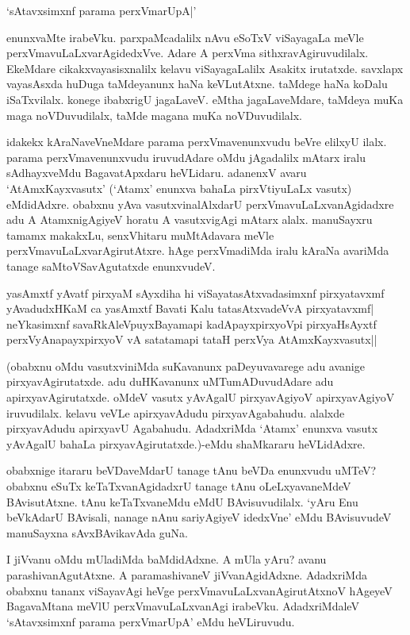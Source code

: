 \begin{shloka}
`sAtavxsimxnf parama perxVmarUpA|'
\end{shloka}

\noindent enunxvaMte irabeVku. parxpaMcadalilx nAvu eSoTxV viSayagaLa meVle perxVmavuLaLxvarAgidedxVve. Adare A perxVma sithxravAgiruvudilalx. EkeMdare cikakxvayasisxnalilx kelavu viSayagaLalilx Asakitx irutatxde. savxlapx vayasAsxda huDuga taMdeyanunx haNa keVLutAtxne. taMdege haNa koDalu iSaTxvilalx. konege ibabxrigU jagaLaveV. eMtha jagaLaveMdare, taMdeya muKa maga noVDuvudilalx, taMde magana muKa noVDuvudilalx.

idakekx kAraNaveVneMdare parama perxVmavenunxvudu beVre elilxyU ilalx. parama perxVmavenunxvudu iruvudAdare oMdu jAgadalilx mAtarx iralu sAdhayxveMdu BagavatApxdaru heVLidaru. adanenxV avaru `AtAmxKayxvasutx' (`Atamx' enunxva bahaLa pirxVtiyuLaLx vasutx) eMdidAdxre. obabxnu yAva vasutxvinalAlxdarU perxVmavuLaLxvanAgidadxre adu A AtamxnigAgiyeV horatu A vasutxvigAgi mAtarx alalx. manuSayxru tamamx makakxLu, senxVhitaru muMtAdavara meVle perxVmavuLaLxvarAgirutAtxre. hAge perxVmadiMda iralu kAraNa avariMda tanage saMtoVSavAgutatxde enunxvudeV.

\begin{shloka}
yasAmxtf yAvatf pirxyaM sAyxdiha hi viSayatasAtxvadasimxnf pirxyatavxmf\\
yAvadudxHKaM ca yasAmxtf Bavati Kalu tatasAtxvadeVvA pirxyatavxmf|\\
neYkasimxnf savaRkAleV\s puyxBayamapi kadA\s payxpirxyoV\s pi pirxyaHsAyxtf\\
perxVyAnapayxpirxyoV vA satatamapi tataH perxVya AtAmxKayxvasutx||
\end{shloka}

(obabxnu oMdu vasutxviniMda suKavanunx paDeyuvavarege adu avanige pirxyavAgirutatxde. adu duHKavanunx uMTumADuvudAdare adu apirxyavAgirutatxde. oMdeV vasutx yAvAgalU pirxyavAgiyoV apirxyavAgiyoV iruvudilalx. kelavu veVLe apirxyavAdudu pirxyavAgabahudu. alalxde pirxyavAdudu apirxyavU Agabahudu. AdadxriMda `Atamx' enunxva vasutx yAvAgalU bahaLa pirxyavAgirutatxde.)-eMdu shaMkararu heVLidAdxre.

obabxnige itararu beVDaveMdarU tanage tAnu beVDa enunxvudu uMTeV? obabxnu eSuTx keTaTxvanAgidadxrU tanage tAnu oLeLxyavaneMdeV BAvisutAtxne. tAnu keTaTxvaneMdu eMdU BAvisuvudilalx. `yAru Enu beVkAdarU BAvisali, nanage nAnu sariyAgiyeV idedxVne' eMdu BAvisuvudeV manuSayxna sAvxBAvikavAda guNa.

I jiVvanu oMdu mUladiMda baMdidAdxne. A mUla yAru? avanu parashivanAgutAtxne. A paramashivaneV jiVvanAgidAdxne. AdadxriMda obabxnu tananx viSayavAgi heVge perxVmavuLaLxvanAgirutAtxnoV hAgeyeV BagavaMtana meVlU perxVmavuLaLxvanAgi irabeVku. AdadxriMdaleV `sAtavxsimxnf parama perxVmarUpA' eMdu heVLiruvudu.

